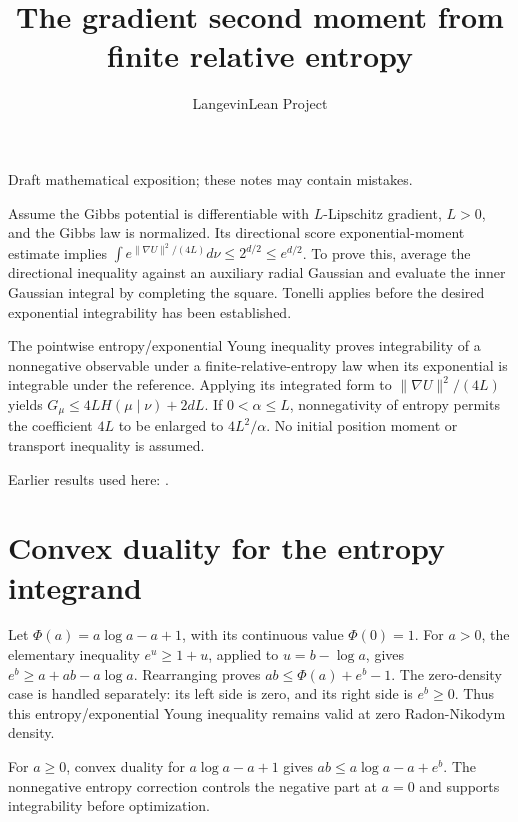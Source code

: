 \documentclass[11pt,a4paper]{article}
\title{\texorpdfstring{The gradient second moment from finite relative entropy}{The gradient second moment from finite relative entropy}}
\author{LangevinLean Project}
\date{}
\begin{document}
\maketitle
Draft mathematical exposition; these notes may contain mistakes.


Assume the Gibbs potential is differentiable with \(L\)-Lipschitz gradient, \(L>0\), and the Gibbs law is normalized. Its directional score exponential-moment estimate implies \(\int e^{\|\nabla U\|^2/(4L)}d\nu\le2^{d/2}\le e^{d/2}\). To prove this, average the directional inequality against an auxiliary radial Gaussian and evaluate the inner Gaussian integral by completing the square. Tonelli applies before the desired exponential integrability has been established.



The pointwise entropy/\allowbreak{}exponential Young inequality proves integrability of a nonnegative observable under a finite-relative-entropy law when its exponential is integrable under the reference. Applying its integrated form to \(\|\nabla U\|^2/(4L)\) yields \(G_\mu\le4L H(\mu\mid\nu)+2dL\). If \(0<\alpha\le L\), nonnegativity of entropy permits the coefficient \(4L\) to be enlarged to \(4L^2/\alpha\). No initial position moment or transport inequality is assumed.



Earlier results used here: \cite[Section~3.27]{LangevinLean2026ULASC}.

\section{\texorpdfstring{Convex duality for the entropy integrand}{Convex duality for the entropy integrand}}


Let \(\Phi(a)=a\log a-a+1\), with its continuous value \(\Phi(0)=1\). For \(a>0\), the elementary inequality \(e^u\ge1+u\), applied to \(u=b-\log a\), gives \(e^b\ge a+ab-a\log a\). Rearranging proves \(ab\le\Phi(a)+e^b-1\). The zero-density case is handled separately: its left side is zero, and its right side is \(e^b\ge0\). Thus this entropy/\allowbreak{}exponential Young inequality remains valid at zero Radon-Nikodym density.



For \(a\ge0\), convex duality for \(a\log a-a+1\) gives \(ab\le a\log a-a+e^b\). The nonnegative entropy correction controls the negative part at \(a=0\) and supports integrability before optimization.
\end{document}
